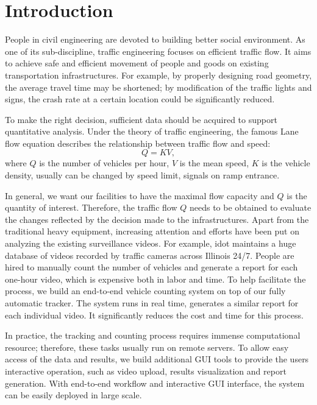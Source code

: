 \section{Introduction}
\label{sec:sys-intro}

People in civil engineering are devoted to building better social environment.
As one of its sub-discipline, traffic engineering focuses on efficient traffic flow. 
It aims to achieve safe and efficient movement of people and goods on existing transportation infrastructures. 
For example, by properly designing road geometry, the average travel time may be shortened; 
by modification of the traffic lights and signs, the crash rate at a certain location could be significantly reduced.

To make the right decision, sufficient data should be acquired to support quantitative analysis.
Under the theory of traffic engineering, the famous Lane flow equation \cite{roess2004traffic} describes the relationship between traffic flow and speed:
$$Q = KV,$$
where $Q$ is the number of vehicles per hour, $V$ is the mean speed, $K$ is the vehicle density, usually can be changed by speed limit, signals on ramp entrance. 

In general, we want our facilities to have the maximal flow capacity and $Q$ is the quantity of interest.
Therefore, the traffic flow $Q$ needs to be obtained to evaluate the changes reflected by the decision made to the infrastructures.
Apart from the traditional heavy equipment, increasing attention and efforts have been put on analyzing the existing surveillance videos.
For example, \gls{idot} maintains a huge database of videos recorded by traffic cameras across Illinois 24/7. 
People are hired to manually count the number of vehicles and generate a report for each one-hour video, which is expensive both in labor and time.
To help facilitate the process, we build an end-to-end vehicle counting system on top of our fully automatic tracker. 
The system runs in real time, generates a similar report for each individual video. It significantly reduces the cost and time for this process.

In practice, the tracking and counting process requires immense computational resource; therefore, these tasks usually run on remote servers. 
To allow easy access of the data and results, we build additional GUI tools to provide the users interactive operation, such as video upload, results visualization and report generation.
With end-to-end workflow and interactive GUI interface, the system can be easily deployed in large scale.